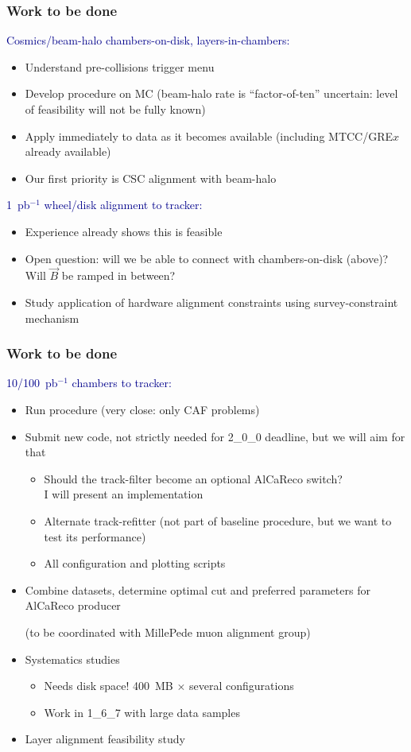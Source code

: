 \documentclass[compress]{beamer}
\begin{document}
\begin{frame}
\frametitle{Work to be done}
\textcolor{darkblue}{Cosmics/beam-halo chambers-on-disk, layers-in-chambers:}
\begin{itemize}
\item Understand pre-collisions trigger menu
\item Develop procedure on MC (beam-halo rate is ``factor-of-ten''
uncertain: level of feasibility will not be fully known)
\item Apply immediately to data as it becomes available (including
MTCC/GRE$x$ already available)
\item Our first priority is CSC alignment with beam-halo
\end{itemize}

\vfill
\textcolor{darkblue}{1~pb$^{-1}$ wheel/disk alignment to tracker:}
\begin{itemize}
\item Experience already shows this is feasible
\item Open question: will we be able to connect with chambers-on-disk
(above)?  Will $\vec{B}$ be ramped in between?
\item Study application of hardware alignment constraints using
survey-constraint mechanism
\end{itemize}
\end{frame}

\begin{frame}
\frametitle{Work to be done}
\textcolor{darkblue}{10/100~pb$^{-1}$ chambers to tracker:}
\begin{itemize}
\item Run procedure (very close: only CAF problems)
\item Submit new code, not strictly needed for 2\_0\_0 deadline, but we will aim for that
\begin{itemize}
\item Should the track-filter become an optional AlCaReco switch?  \\ I will present an implementation
\item Alternate track-refitter (not part of baseline procedure, but we want to test its performance)
\item All configuration and plotting scripts
\end{itemize}
\item Combine datasets, determine optimal cut and preferred parameters
for AlCaReco producer

(to be coordinated with MillePede muon alignment group)
\item Systematics studies
\begin{itemize}
\item Needs disk space!  400~MB $\times$ several configurations
\item Work in 1\_6\_7 with large data samples
\end{itemize}
\item Layer alignment feasibility study
\end{itemize}
\end{frame}
\end{document}
